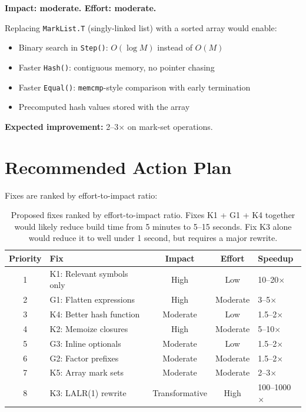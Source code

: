 \documentclass[11pt]{article}
\begin{document}
\textbf{Impact: moderate. \quad Effort: moderate.}

Replacing \texttt{MarkList.T} (singly-linked list) with a sorted
array would enable:

\begin{itemize}[nosep]
\item Binary search in \texttt{Step()}: $O(\log M)$ instead of $O(M)$
\item Faster \texttt{Hash()}: contiguous memory, no pointer chasing
\item Faster \texttt{Equal()}: \texttt{memcmp}-style comparison with
  early termination
\item Precomputed hash values stored with the array
\end{itemize}

\textbf{Expected improvement:} 2--3$\times$ on mark-set operations.

\section{Recommended Action Plan}

Fixes are ranked by effort-to-impact ratio:

\begin{table}[h]
\centering
\begin{tabular}{@{}clccl@{}}
\toprule
Priority & Fix & Impact & Effort & Speedup \\
\midrule
1 & K1: Relevant symbols only & High   & Low      & 10--20$\times$ \\
2 & G1: Flatten expressions   & High   & Moderate & 3--5$\times$ \\
3 & K4: Better hash function  & Moderate & Low    & 1.5--2$\times$ \\
4 & K2: Memoize closures      & High   & Moderate & 5--10$\times$ \\
5 & G3: Inline optionals      & Moderate & Low    & 1.5--2$\times$ \\
6 & G2: Factor prefixes       & Moderate & Moderate & 1.5--2$\times$ \\
7 & K5: Array mark sets       & Moderate & Moderate & 2--3$\times$ \\
8 & K3: LALR(1) rewrite       & Transformative & High & 100--1000$\times$ \\
\bottomrule
\end{tabular}
\caption{Proposed fixes ranked by effort-to-impact ratio.
  Fixes K1 + G1 + K4 together would likely reduce build time
  from 5 minutes to 5--15 seconds.  Fix K3 alone would reduce it
  to well under 1 second, but requires a major rewrite.}
\label{tab:fixes}
\end{table}
\end{document}
